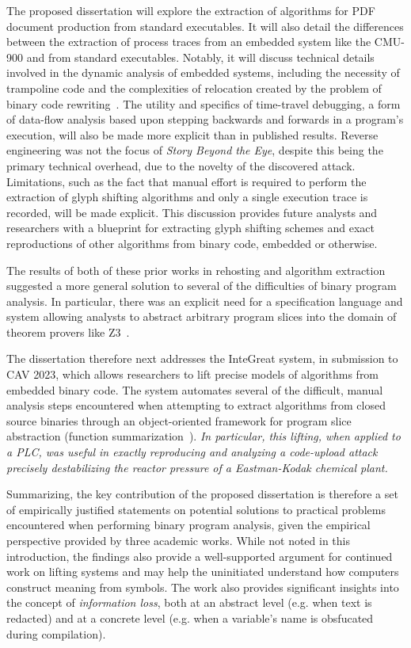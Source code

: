 The proposed dissertation will explore the extraction of algorithms for PDF document production from standard executables.
It will also detail the differences between the extraction of process traces from an embedded system like the CMU-900 and from standard executables.
Notably, it will discuss technical details involved in the dynamic analysis of embedded systems, including the necessity of trampoline code and the complexities of relocation created by the problem of binary code rewriting~\cite{wenzl2019hack}.
The utility and specifics of time-travel debugging, a form of data-flow analysis based upon stepping backwards and forwards in a program's execution, will also be made more explicit than in published results.
Reverse engineering was not the focus of \emph{Story Beyond the Eye}, despite this being the primary technical overhead, due to the novelty of the discovered attack.
Limitations, such as the fact that manual effort is required to perform the extraction of glyph shifting algorithms and only a single execution trace is recorded, will be made explicit.
This discussion provides future analysts and researchers with a blueprint for extracting glyph shifting schemes and exact reproductions of other algorithms from binary code, embedded or otherwise.

The results of both of these prior works in rehosting and algorithm extraction suggested a more general solution to several of the difficulties of binary program analysis.
In particular, there was an explicit need for a specification language and system allowing analysts to abstract arbitrary program slices into the domain of theorem provers like Z3~\cite{de2008z3}.

The dissertation therefore next addresses the InteGreat system, in submission to CAV 2023, which allows researchers to lift precise models of algorithms from embedded binary code.
The system automates several of the difficult, manual analysis steps encountered when attempting to extract algorithms from closed source binaries through an object-oriented framework for program slice abstraction (function summarization~\cite{alt2017hifrog}).
\emph{In particular, this lifting, when applied to a PLC, was useful in exactly reproducing and analyzing a code-upload attack precisely destabilizing the reactor pressure of a Eastman-Kodak chemical plant.}

Summarizing, the key contribution of the proposed dissertation is therefore a set of empirically justified statements on potential solutions to practical problems encountered when performing binary program analysis, given the empirical perspective provided by three academic works.
While not noted in this introduction, the findings also provide a well-supported argument for continued work on lifting systems and may help the uninitiated understand how computers construct meaning from symbols.
The work also provides significant insights into the concept of \emph{information loss}, both at an abstract level (e.g. when text is redacted) and at a concrete level (e.g. when a variable's name is obsfucated during compilation).

